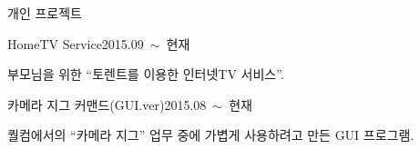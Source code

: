 \documentclass{resume} %
\begin{document}
\begin{rSection}{개인 프로젝트}

  \begin{rSubsection}{HomeTV Service}{2015.09~$\sim$~현재}{}{}
  \item \small{
      부모님을 위한 ``토렌트를 이용한 인터넷TV 서비스''.}
  \end{rSubsection}

  \begin{rSubsection}{카메라 지그 커맨드(\small{GUI.ver})}{2015.08~$\sim$~현재}{}{}
  \item \small{
      퀄컴에서의 ``카메라 지그'' 업무 중에 가볍게 사용하려고 만든 GUI 프로그램.}
  \end{rSubsection}


\end{rSection}
\end{document}
